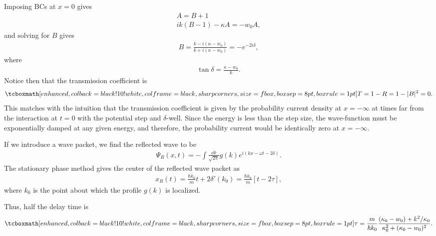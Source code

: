 {Imposing BCs at $x = 0$ gives
\begin{gather}
    A = B + 1 \\
    ik(B - 1) - \kappa A = -w_0 A
,\end{gather}
and solving for $B$ gives
\begin{eqnarray}
    B = \frac{k - i(\kappa - w_0)}{k + i(\kappa - w_0)} = -e^{-2i\delta}
,\end{eqnarray}
where
\begin{eqnarray}
    \tan{\delta} = \frac{\kappa - w_0}{k}
.\end{eqnarray}
Notice then that the transmission coefficient is
\begin{eqnarray}
    \eqbox{ T = 1 - R = 1 - |B|^2 = 0 }
.\end{eqnarray}
This matches with the intuition that the transmission coefficient is given by the probability current density at $x = -\infty$ at times far from the interaction at $t = 0$ with the potential step and $\delta$-well.
Since the energy is less than the step size, the wave-function must be exponentially damped at any given energy, and therefore, the probability current would be identically zero at $x = -\infty$.

If we introduce a wave packet, we find the reflected wave to be
\begin{eqnarray}
    \Psi_{R}(x,t) = -\int \frac{\dd{k}}{\sqrt{2 \pi}} g(k) e^{i(kx - \omega t - 2\delta)}
.\end{eqnarray}
The stationary phase method gives the center of the reflected wave packet as
\begin{eqnarray}
    x_{R}(t) = \frac{\hbar k_0}{m} t + 2 \delta'(k_0) = \frac{\hbar k_0}{m} [t - 2\tau]
,\end{eqnarray}
where $k_0$ is the point about which the profile $g(k)$ is localized.

Thus, half the delay time is 
\begin{eqnarray}
    \eqbox{ \tau = \frac{m}{\hbar k_0} \frac{(\kappa_0 - w_0) + k^2/\kappa_0}{\kappa_0^2 + (\kappa_0-w_0)^2} }
.\end{eqnarray}


}




